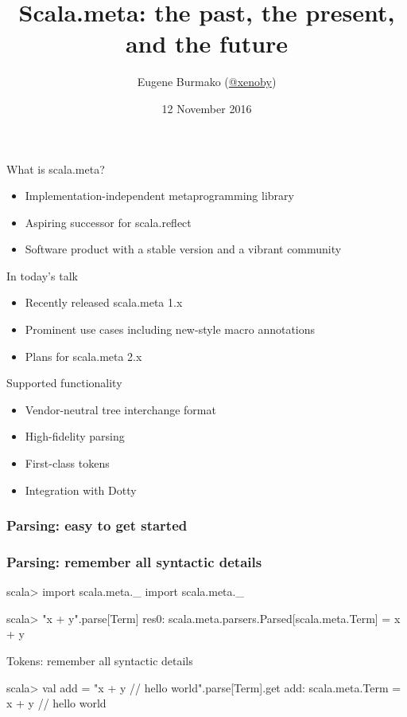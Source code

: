 \documentclass[svgnames,dvipsnames,hyperref={bookmarks=false},usepdftitle=false]{beamer}
\title{Scala.meta: the past, the present, and the future}
\author{Eugene Burmako (\href{https://twitter.com/xeno_by}{@xeno{\textunderscore}by})}
\date{12 November 2016}
\begin{document}
\titleframe

\begin{frame}{What is scala.meta?}
\begin{itemize}
\item Implementation-independent metaprogramming library
\item Aspiring successor for scala.reflect
\item Software product with a stable version and a vibrant community
\end{itemize}
\end{frame}

\begin{frame}{In today's talk}
\begin{itemize}
\item Recently released scala.meta 1.x
\item Prominent use cases including new-style macro annotations
\item Plans for scala.meta 2.x
\end{itemize}
\end{frame}


\begin{frame}{Supported functionality}
\begin{itemize}
\item Vendor-neutral tree interchange format
\item High-fidelity parsing
\item First-class tokens
\item Integration with Dotty
\end{itemize}
\end{frame}

\begin{frame}[fragile]
\frametitle<1>{Parsing: easy to get started}
\frametitle<2>{Parsing: remember all syntactic details}
\begin{semiverbatim}
scala> import scala.meta._
import scala.meta._

scala> "x + y".parse[Term]
res0: scala.meta.parsers.Parsed[scala.meta.Term] = x + y

\end{semiverbatim}
\end{frame}

\begin{frame}[fragile]{Tokens: remember all syntactic details}
\begin{semiverbatim}
scala> val add = "x + y // hello world".parse[Term].get
add: scala.meta.Term = x + y // hello world


\only<2->{res3: String = Tokens(BOF [0..0), x [0..1),  [1..2), }
\only<2->{+ [2..3), [3..4), y [4..5),   [5..6), }
\only<2->{// hello world [6..20), EOF [20..20))}
\end{semiverbatim}
\end{frame}
\end{document}
